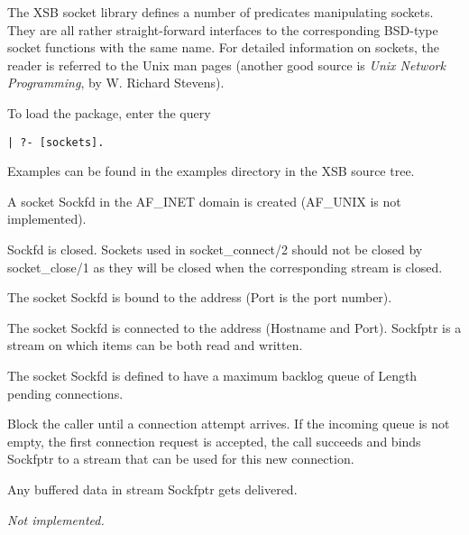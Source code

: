 The XSB socket library defines a number of predicates manipulating
sockets. They are all rather straight-forward interfaces to the
corresponding BSD-type socket functions with the same name. For detailed
information on sockets, the reader is referred to the Unix man pages
(another good source is \emph{Unix Network Programming}, by W. Richard
Stevens).

To load the package, enter the query 
\begin{verbatim}
| ?- [sockets].
\end{verbatim}

Examples can be found in the examples directory in the XSB source tree.

\begin{description}
    A socket Sockfd in the AF\_INET domain is created (AF\_UNIX is not
implemented). 

    Sockfd is closed. Sockets used in socket\_connect/2 should not be
closed by socket\_close/1 as they will be closed when the corresponding
stream is closed.

   The socket Sockfd is bound to the address (Port is the port number).

    The socket Sockfd is connected to the address (Hostname and
Port). Sockfptr is a stream on which items can be both read and written.

    The socket Sockfd is defined to have a maximum backlog queue of
Length pending connections.

    Block the caller until a connection attempt arrives. If the incoming 
    queue is not empty, the first connection request is accepted, the call
    succeeds and binds Sockfptr to a stream that can be used for this new
    connection.

    Any buffered data in stream Sockfptr gets delivered.

  \emph{Not implemented.}

\end{description}

